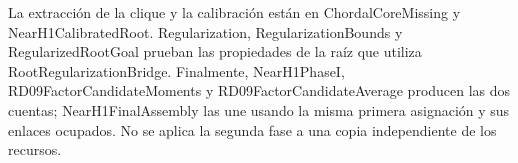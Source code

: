 \documentclass[spanish,11pt,a4paper]{article}
\begin{document}
La extracción de la clique y la calibración están en {\ttfamily\small ChordalCoreM\discretionary{\hbox{\ensuremath{\hookrightarrow}}}{}{}issing} y {\ttfamily\small NearH1Calibr\discretionary{\hbox{\ensuremath{\hookrightarrow}}}{}{}atedRoot}. {\ttfamily\small Regularizati\discretionary{\hbox{\ensuremath{\hookrightarrow}}}{}{}on}, {\ttfamily\small Regularizati\discretionary{\hbox{\ensuremath{\hookrightarrow}}}{}{}onBounds} y {\ttfamily\small RegularizedR\discretionary{\hbox{\ensuremath{\hookrightarrow}}}{}{}ootGoal} prueban las propiedades de la raíz que utiliza {\ttfamily\small RootRegulari\discretionary{\hbox{\ensuremath{\hookrightarrow}}}{}{}zationBridge}. Finalmente, {\ttfamily\small NearH1PhaseI}, {\ttfamily\small RD09FactorCa\discretionary{\hbox{\ensuremath{\hookrightarrow}}}{}{}ndidateMomen\discretionary{\hbox{\ensuremath{\hookrightarrow}}}{}{}ts} y {\ttfamily\small RD09FactorCa\discretionary{\hbox{\ensuremath{\hookrightarrow}}}{}{}ndidateAvera\discretionary{\hbox{\ensuremath{\hookrightarrow}}}{}{}ge} producen las dos cuentas; {\ttfamily\small NearH1FinalA\discretionary{\hbox{\ensuremath{\hookrightarrow}}}{}{}ssembly} las une usando la misma primera asignación y sus enlaces ocupados. No se aplica la segunda fase a una copia independiente de los recursos.
\end{document}
